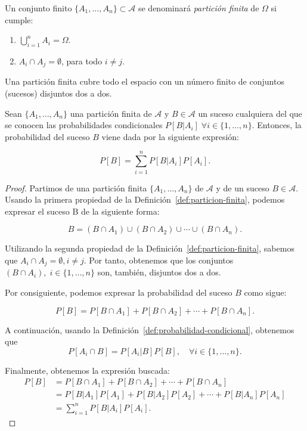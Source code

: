 \begin{definicion}\label{def:particion-finita}
    Un conjunto finito $\{A_1, \ldots, A_n \} \subset \mathcal{A}$ se denominará \emph{partición finita} de $\Omega$ si cumple:

    \begin{enumerate}
        \item $\bigcup\limits_{i=1}^n A_i = \Omega$.
        \item $A_i \cap A_j = \emptyset$, para todo $i \neq j$.
    \end{enumerate}
\end{definicion}

Una partición finita cubre todo el espacio con un número finito de conjuntos (sucesos) disjuntos dos a dos.

\begin{teorema}\label{teo:probabilidad-total}
    Sean $\{A_1, \ldots, A_n \}$ una partición finita de $\mathcal{A}$ y $B \in \mathcal{A}$ un suceso cualquiera del que se conocen las probabilidades condicionales $P[B|A_i] \; \forall i \in \{1, \ldots, n \}$. Entonces, la probabilidad del suceso $B$ viene dada por la siguiente expresión:

    \[ P[B] = \sum_{i=1}^{n} P[B|A_i]P[A_i]. \]
\end{teorema}

\begin{proof}
    Partimos de una partición finita $\{A_1, \ldots, A_n \}$ de $\mathcal{A}$ y de un suceso $B \in \mathcal{A}$. Usando la primera propiedad de la Definición~\ref{def:particion-finita}, podemos expresar el suceso B de la siguiente forma:

    \[ B = (B \cap A_1) \cup (B \cap A_2) \cup \cdots \cup (B \cap A_n). \]

    Utilizando la segunda propiedad de la Definición~\ref{def:particion-finita}, sabemos que $A_i \cap A_j = \emptyset, i \neq j$. Por tanto, obtenemos que los conjuntos $(B \cap A_i), \; i \in \{1, \ldots, n\}$ son, también, disjuntos dos a dos.

    Por consiguiente, podemos expresar la probabilidad del suceso $B$ como sigue:

    \[ P[B] = P[B \cap A_1] + P[B \cap A_2] + \cdots + P[B \cap A_n]. \]

    A continuación, usando la Definición~\ref{def:probabilidad-condicional}, obtenemos que 
    \[ P[A_i \cap B] = P[A_i | B]P[B],\quad \forall i \in \{1, \ldots, n\}. \]
    
    Finalmente, obtenemos la expresión buscada:
    \begin{align*}
        P[B] &= P[B \cap A_1] + P[B \cap A_2] + \cdots + P[B \cap A_n] \\
             &= P[B|A_1]P[A_1] + P[B|A_2]P[A_2] + \cdots + P[B|A_n]P[A_n] \\
             &= \sum_{i=1}^n P[B|A_i]P[A_i].
    \end{align*}
\end{proof}

